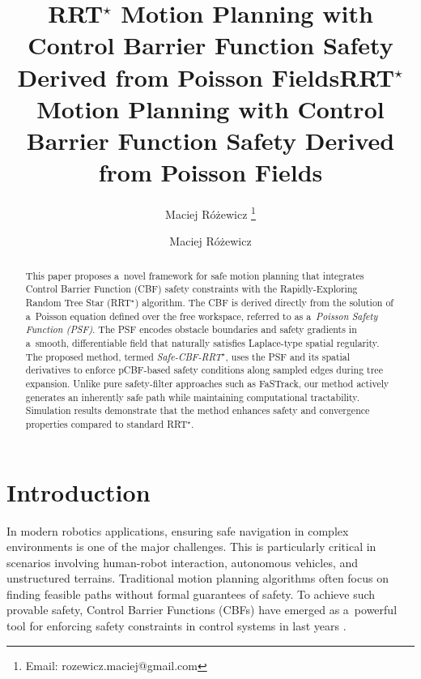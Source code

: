 \documentclass{svproc}
\title{RRT$^\star$ Motion Planning with Control Barrier Function Safety Derived from Poisson Fields}
\author{Maciej Różewicz
    \thanks{Email: rozewicz.maciej@gmail.com}
}
\begin{document}
\mainmatter              %
%
\title{RRT$^\star$ Motion Planning with Control Barrier Function Safety Derived from Poisson Fields}
%
%
\author{Maciej Różewicz}
%
%
%

\maketitle              %
\begin{abstract}
This paper proposes a~novel framework for safe motion planning that integrates
Control Barrier Function (CBF) safety constraints with the Rapidly-Exploring
Random Tree Star (RRT$^\star$) algorithm. The CBF is derived directly from the solution
of a~Poisson equation defined over the free workspace, referred to as
a~\emph{Poisson Safety Function (PSF)}. The PSF encodes obstacle boundaries
and safety gradients in a~smooth, differentiable field that naturally satisfies
Laplace-type spatial regularity. The proposed method, termed
\emph{Safe-CBF-RRT$^\star$}, uses the PSF and its spatial derivatives to enforce
pCBF-based safety conditions along sampled edges during tree expansion. Unlike
pure safety-filter approaches such as FaSTrack, our method actively generates an
inherently safe path while maintaining computational tractability.
Simulation results demonstrate that the method enhances safety and convergence
properties compared to standard RRT$^\star$.
\end{abstract}

\section{Introduction}
In modern robotics applications, ensuring safe navigation in complex
environments is one of the major challenges. This is particularly critical in
scenarios involving human-robot interaction, autonomous vehicles, and
unstructured terrains. Traditional motion planning algorithms often focus on
finding feasible paths without formal guarantees of safety. To achieve such
provable safety, Control Barrier Functions (CBFs) have emerged as a~powerful
tool for enforcing safety constraints in control systems in last years \cite{8796030}. 
\end{document}
